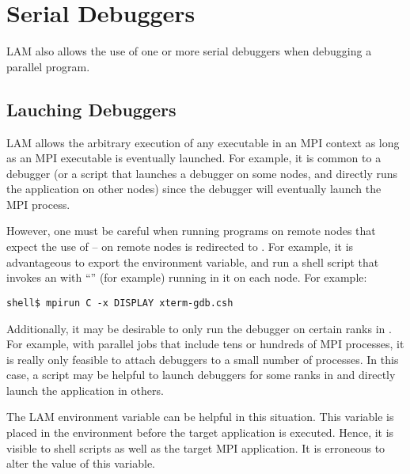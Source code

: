
\section{Serial Debuggers}
\label{sec:debug-serial}

LAM also allows the use of one or more serial debuggers when debugging
a parallel program.  


\subsection{Lauching Debuggers}

LAM allows the arbitrary execution of any executable in an MPI context
as long as an MPI executable is eventually launched.  For example, it
is common to  a debugger (or a script that launches a
debugger on some nodes, and directly runs the application on other
nodes) since the debugger will eventually launch the MPI process.

However, one must be careful when running programs on remote nodes
that expect the use of  --  on remote nodes is
redirected to .  For example, it is advantageous to
export the  environment variable, and run a shell
script that invokes an  with ``'' (for example)
running in it on each node.  For example:

\lstset{style=lam-cmdline}
\begin{lstlisting}
shell$ mpirun C -x DISPLAY xterm-gdb.csh
\end{lstlisting}

Additionally, it may be desirable to only run the debugger on certain
ranks in .  For example, with parallel
jobs that include tens or hundreds of MPI processes, it is really only
feasible to attach debuggers to a small number of processes.  In this
case, a script may be helpful to launch debuggers for some ranks in
 and directly launch the application in
others.  

The LAM environment variable  can be helpful in this
situation.  This variable is placed in the environment before the
target application is executed.  Hence, it is visible to shell scripts
as well as the target MPI application.  It is erroneous to alter the
value of this variable.

